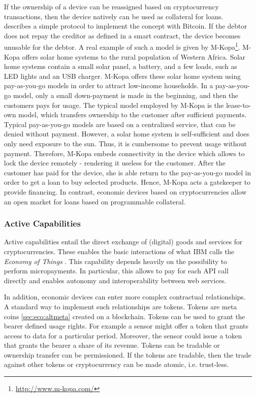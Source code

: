 If the ownership of a device can be reassigned based on cryptocurrency transactions, then the device natively can be used as collateral for loans. \cite{smartproperty2011} describes a simple protocol to implement the concept with Bitcoin. If the debtor does not repay the creditor as defined in a smart contract, the device becomes unusable for the debtor. A real example of such a model is given by M-Kopa\footnote{\url{http://www.m-kopa.com/}}. M-Kopa offers solar home systems to the rural population of Western Africa. Solar home systems contain a small solar panel, a battery, and a few loads, such as LED lights and an USB charger. M-Kopa offers these solar home system using pay-as-you-go models in order to attract low-income households. In a pay-as-you-go model, only a small down-payment is made in the beginning, and then the customers pays for usage. The typical model employed by M-Kopa is the lease-to-own model, which transfers ownership to the customer after sufficient payments. Typical pay-as-you-go models are based on a centralized service, that can be denied without payment. However, a solar home system is self-sufficient and does only need exposure to the sun. Thus, it is cumbersome to prevent usage without payment. Therefore, M-Kopa embeds connectivity in the device which allows to lock the device remotely - rendering it useless for the customer. After the customer has paid for the device, she is able return to the pay-as-you-go model in order to get a loan to buy selected products. Hence, M-Kopa acts a gatekeeper to provide financing. In contrast, economic devices based on cryptocurrencies allow an open market for loans based on programmable collateral.

\subsubsection{Active Capabilities}

Active capabilities entail the direct exchange of (digital) goods and services for cryptocurrencies. These enables the basic interactions of what IBM calls the \emph{Economy of Things} \parencite{Pureswaran2015}. This capability depends heavily on the possibility to perform micropayments. In particular, this allows to pay for each \ac{API} call directly and enables autonomy and interoperability between web services. 

In addition, economic devices can enter more complex contractual relationships. A standard way to implement such relationships are tokens. Tokens are meta coins \ref{sec:eco:altmeta} created on a blockchain. Tokens can be used to grant the bearer defined usage rights. For example a sensor might offer a token that grants access to data for a particular period. Moreover, the sensor could issue a token that grants the bearer a share of its revenue. Tokens can be tradable or ownership transfer can be permissioned. If the tokens are tradable, then the trade against other tokens or cryptocurrency can be made atomic, i.e. trust-less.

